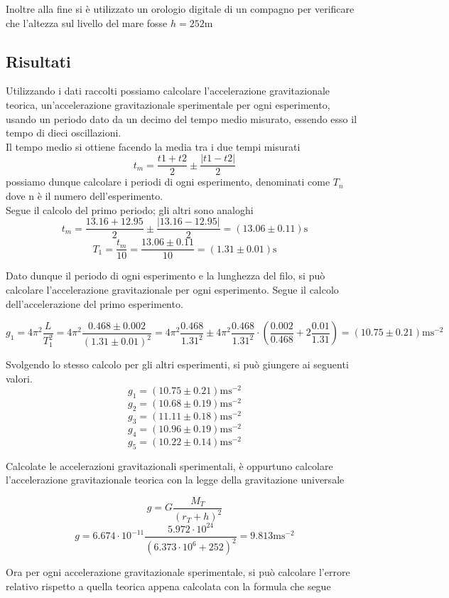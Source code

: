 \documentclass{article}
\begin{document}
Inoltre alla fine si è utilizzato un orologio digitale di un compagno per verificare che l'altezza sul livello del mare fosse $h = 252 \mathrm{m}$

\subsection{Risultati}
Utilizzando i dati raccolti possiamo calcolare l'accelerazione gravitazionale teorica, un'accelerazione gravitazionale sperimentale per ogni esperimento, usando un periodo dato da un decimo del tempo medio misurato, essendo esso il tempo di dieci oscillazioni.\\
Il tempo medio si ottiene facendo la media tra i due tempi misurati
$$t_m = \frac{t1 + t2}{2} \pm \frac{|t1 - t2|}{2}$$
possiamo dunque calcolare i periodi di ogni esperimento, denominati come $T_n$ dove n è il numero dell'esperimento.\\
Segue il calcolo del primo periodo; gli altri sono analoghi
$$t_m = \frac{13.16 + 12.95}{2} \pm \frac{|13.16 - 12.95|}{2} = (13.06 \pm 0.11)\mathrm{s}$$
$$T_1 = \frac{t_m}{10} = \frac{13.06 \pm 0.11}{10} = (1.31 \pm 0.01)\mathrm{s}$$

Dato dunque il periodo di ogni esperimento e la lunghezza del filo, si può calcolare l'accelerazione gravitazionale per ogni esperimento. Segue il calcolo dell'accelerazione del primo esperimento.

$$g_1 = 4\pi^2\frac{L}{T_1^2} = 4\pi^2\frac{0.468 \pm 0.002}{(1.31 \pm 0.01)^2} = 4\pi^2\frac{0.468}{1.31^2} \pm 4\pi^2\frac{0.468}{1.31^2} \cdot (\frac{0.002}{0.468} + 2\frac{0.01}{1.31}) = (10.75 \pm 0.21)\mathrm{ms^{-2}}$$

Svolgendo lo stesso calcolo per gli altri esperimenti, si può giungere ai seguenti valori.
$$g_1 = (10.75 \pm 0.21)\mathrm{ms^{-2}}$$
$$g_2 = (10.68 \pm 0.19)\mathrm{ms^{-2}}$$
$$g_3 = (11.11 \pm 0.18)\mathrm{ms^{-2}}$$
$$g_4 = (10.96 \pm 0.19)\mathrm{ms^{-2}}$$
$$g_5 = (10.22 \pm 0.14)\mathrm{ms^{-2}}$$

Calcolate le accelerazioni gravitazionali sperimentali, è oppurtuno calcolare l'accelerazione gravitazionale teorica con la legge della gravitazione universale

$$g = G\frac{M_T}{(r_T + h)^2}$$
$$g = 6.674 \cdot 10^{-11} \frac{5.972 \cdot 10^{24}}{(6.373 \cdot 10^6 + 252)^2} = 9.813\mathrm{ms^{-2}}$$

Ora per ogni accelerazione gravitazionale sperimentale, si può calcolare l'errore relativo rispetto a quella teorica appena calcolata con la formula che segue
\end{document}
